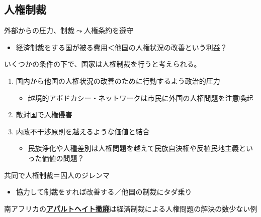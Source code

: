 \documentclass[
  xelatex,
  ja=standard]{bxjsarticle}
\providecommand{\tightlist}{%
  \setlength{\itemsep}{0pt}\setlength{\parskip}{0pt}}\usepackage{longtable,booktabs,array}
\begin{document}
\hypertarget{ux4ebaux6a29ux5236ux88c1}{%
\subsection{人権制裁}\label{ux4ebaux6a29ux5236ux88c1}}

外部からの圧力、制裁\(\leadsto\)人権条約を遵守

\begin{itemize}
\tightlist
\item
  経済制裁をする国が被る費用＜他国の人権状況の改善という利益？
\end{itemize}

いくつかの条件の下で、国家は人権制裁を行うと考えられる。

\begin{enumerate}
\def\labelenumi{\arabic{enumi}.}
\tightlist
\item
  国内から他国の人権状況の改善のために行動するよう政治的圧力

  \begin{itemize}
  \tightlist
  \item
    越境的アボドカシー・ネットワークは市民に外国の人権問題を注意喚起
  \end{itemize}
\item
  敵対国で人権侵害
\item
  内政不干渉原則を越えるような価値と結合

  \begin{itemize}
  \tightlist
  \item
    民族浄化や人種差別は人権問題を越えて民族自決権や反植民地主義といった価値の問題？
  \end{itemize}
\end{enumerate}

共同で人権制裁＝囚人のジレンマ

\begin{itemize}
\tightlist
\item
  協力して制裁をすれば改善する／他国の制裁にタダ乗り
\end{itemize}

南アフリカの\href{https://www.unic.or.jp/activities/humanrights/discrimination/apartheid/}{\textbf{アパルトヘイト撤廃}}は経済制裁による人権問題の解決の数少ない例
\end{document}
